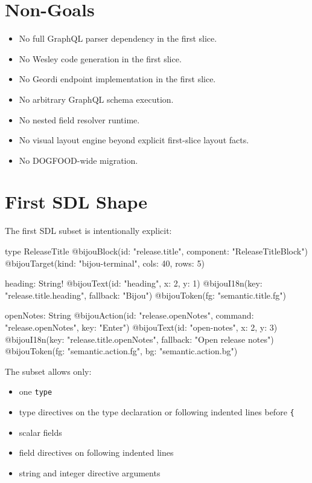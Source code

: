 \section{Non-Goals}\label{record-140-non-goals}

\begin{itemize}
\tightlist
\item
  No full GraphQL parser dependency in the first slice.
\item
  No Wesley code generation in the first slice.
\item
  No Geordi endpoint implementation in the first slice.
\item
  No arbitrary GraphQL schema execution.
\item
  No nested field resolver runtime.
\item
  No visual layout engine beyond explicit first-slice layout facts.
\item
  No DOGFOOD-wide migration.
\end{itemize}

\section{First SDL Shape}\label{record-140-first-sdl-shape}

The first SDL subset is intentionally explicit:

\begin{CodeBlock}
type ReleaseTitle
  @bijouBlock(id: "release.title", component: "ReleaseTitleBlock")
  @bijouTarget(kind: "bijou-terminal", cols: 40, rows: 5) {
  heading: String!
    @bijouText(id: "heading", x: 2, y: 1)
    @bijouI18n(key: "release.title.heading", fallback: "Bijou")
    @bijouToken(fg: "semantic.title.fg")

  openNotes: String
    @bijouAction(id: "release.openNotes", command: "release.openNotes", key: "Enter")
    @bijouText(id: "open-notes", x: 2, y: 3)
    @bijouI18n(key: "release.title.openNotes", fallback: "Open release notes")
    @bijouToken(fg: "semantic.action.fg", bg: "semantic.action.bg")
}
\end{CodeBlock}

The subset allows only:

\begin{itemize}
\tightlist
\item
  one \texttt{t\allowbreak{}y\allowbreak{}p\allowbreak{}e}
\item
  type directives on the type declaration or following indented lines before \texttt{\{}
\item
  scalar fields
\item
  field directives on following indented lines
\item
  string and integer directive arguments
\end{itemize}

